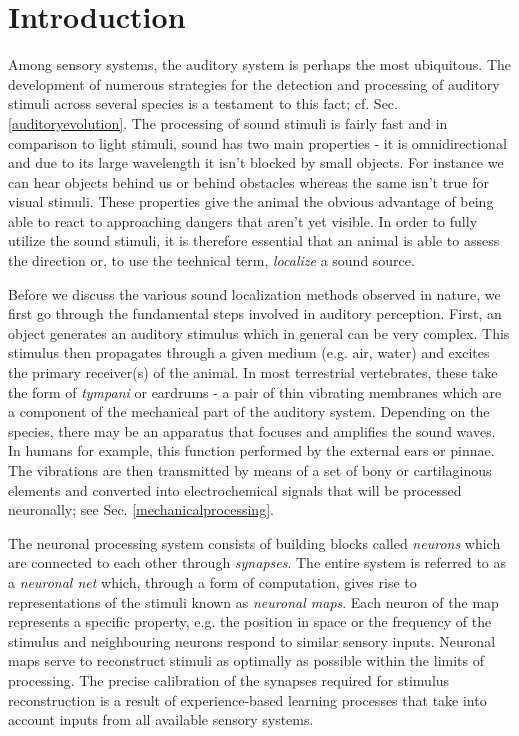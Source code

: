 \documentclass[12pt]{book}
\begin{document}
 
\chapter{Introduction}\label{introchapter}
Among sensory systems, the auditory system is perhaps the most ubiquitous. The 
development of numerous strategies for the detection and processing of auditory stimuli
across several species is a testament to this fact; cf. Sec. \ref{auditoryevolution}. The processing of sound stimuli is fairly fast and in comparison
to light stimuli, sound has two main properties - it is omnidirectional and due to
its large wavelength it isn't blocked by small objects. For instance we can hear objects
behind us or behind obstacles whereas the same isn't true for visual stimuli. These properties 
give the animal the obvious advantage of being able to react to approaching dangers that
aren't yet visible. In order to fully utilize the sound stimuli, it is therefore essential
that an animal is able to assess the direction or, to use the technical term, \emph{localize} a sound source.

Before we discuss the various sound localization methods observed in nature, we first
go through the fundamental steps involved in auditory perception. First, an object generates
an auditory stimulus which in general can be very complex. This stimulus then propagates
through a given medium (e.g. air, water) and excites the primary receiver(s) of the animal. In most
terrestrial vertebrates, these take the form of \emph{tympani} or eardrums - a pair of thin vibrating
membranes which are a component of the mechanical part of the auditory system.
Depending on the species, there may be an apparatus that focuses and amplifies the sound waves. In
humans for example, this function performed by the external ears or pinnae. 
The vibrations are then transmitted by means of a set of bony or cartilaginous elements and
converted into electrochemical signals that will be processed neuronally; see Sec. \ref{mechanicalprocessing}.

The neuronal processing system consists of building blocks called \emph{neurons} which are
connected to each other through \emph{synapses}. The entire system is referred to as a 
\emph{neuronal net} which, through a form of computation, gives rise to representations of the stimuli
known as \emph{neuronal maps}. Each neuron of the map represents a specific property, e.g.
the position in space or the frequency of the stimulus and neighbouring neurons respond to
similar sensory inputs. Neuronal maps serve to reconstruct stimuli as optimally as possible
within the limits of processing. The precise calibration of the
synapses required for stimulus reconstruction is a result of experience-based learning
processes that take into account inputs from all available sensory systems.
\end{document}

